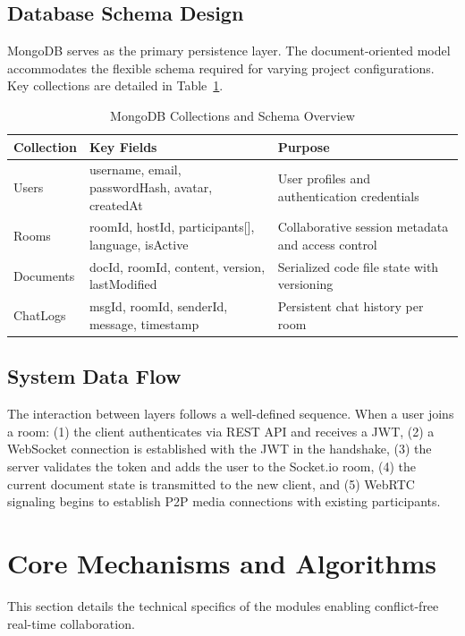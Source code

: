 \documentclass[conference]{IEEEtran}
\begin{document}
\subsection{Database Schema Design}
MongoDB \cite{b9} serves as the primary persistence layer. The document-oriented model accommodates the flexible schema required for varying project configurations. Key collections are detailed in Table~\ref{tab:schema}.

\begin{table}[H]
\centering
\caption{MongoDB Collections and Schema Overview}
\label{tab:schema}
\renewcommand{\arraystretch}{1.2}
\begin{tabular}{|p{1.5cm}|p{3cm}|p{2.8cm}|}
\hline
\textbf{Collection} & \textbf{Key Fields} & \textbf{Purpose} \\
\hline
Users & username, email, passwordHash, avatar, createdAt & User profiles and authentication credentials \\
\hline
Rooms & roomId, hostId, participants[], language, isActive & Collaborative session metadata and access control \\
\hline
Documents & docId, roomId, content, version, lastModified & Serialized code file state with versioning \\
\hline
ChatLogs & msgId, roomId, senderId, message, timestamp & Persistent chat history per room \\
\hline
\end{tabular}
\end{table}

\subsection{System Data Flow}
The interaction between layers follows a well-defined sequence. When a user joins a room: (1) the client authenticates via REST API and receives a JWT, (2) a WebSocket connection is established with the JWT in the handshake, (3) the server validates the token and adds the user to the Socket.io room, (4) the current document state is transmitted to the new client, and (5) WebRTC signaling begins to establish P2P media connections with existing participants.

\section{Core Mechanisms and Algorithms}
This section details the technical specifics of the modules enabling conflict-free real-time collaboration.
\end{document}
